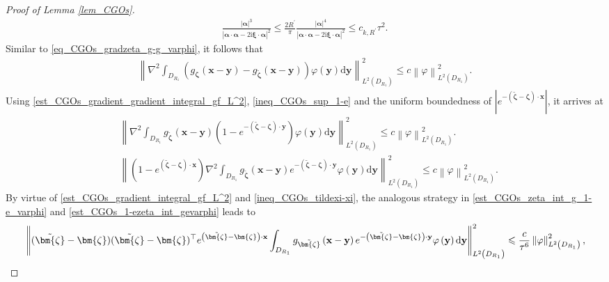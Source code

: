 \documentclass[11pt,reqno,oneside]{amsart}
\theoremstyle{definition}
\theoremstyle{remark}
\numberwithin{equation}{section}
\numberwithin{equation}{section}
\theoremstyle{remark}
\begin{document}
\begin{proof}[Proof of Lemma \ref{lem_CGOs}]
	\begin{align*} 
		\frac{\left| \bm{\alpha} \right|^3}{\left|\bm{\alpha} \cdot \bm{\alpha} - 2\mathrm{i} \bm{\xi} \cdot \bm{\alpha}\right|^2} \leqslant \frac{2R^{\prime}}{\pi}\frac{\left| \bm{\alpha} \right|^4}{\left|\bm{\alpha} \cdot \bm{\alpha} - 2\mathrm{i} \bm{\xi} \cdot \bm{\alpha}\right|^2} \leqslant c_{k,R^{\prime}} \tau^2.
	\end{align*}
	Similar to \eqref{eq_CGOs_gradzeta_g-g_varphi}, it follows that
	\begin{align*}
		\left\| \nabla^2 \int_{D_{R_1}} \left(g_{\bm{\zeta}}\left(\mathbf{x} - \mathbf{y}\right) - g_{\tilde{\bm{\zeta}}}\left(\mathbf{x} - \mathbf{y}\right)\right) \varphi \left(\mathbf{y}\right) \mathrm{d} \mathbf{y} \right\|^2_{L^2\left(D_{R_1}\right)} \leqslant c \left\| \varphi \right\|^2_{L^2\left(D_{R_1}\right)} .
	\end{align*}
	Using \eqref{est_CGOs_gradient_gradient_integral_gf_L^2}, \eqref{ineq_CGOs_sup_1-e} and the uniform boundedness of $ \left| e^{-\left(\tilde{\bm{\zeta}}-\bm{\zeta}\right) \cdot \mathbf{x}} \right| $, it arrives at 
	\begin{align*} 
		& \left\| \nabla^2 \int_{D_{R_1}} g_{\tilde{\bm{\zeta}}}\left(\mathbf{x} - \mathbf{y}\right) \left(1 - e^{-\left(\tilde{\bm{\zeta}}-\bm{\zeta}\right) \cdot \mathbf{y}} \right) \varphi \left(\mathbf{y}\right) \mathrm{d} \mathbf{y} \right\|^2_{L^2\left(D_{R_1}\right)} \leqslant c \left\| \varphi \right\|^2_{L^2\left(D_{R_1}\right)} . \\
		& \left\| \left(1 - e^{\left(\tilde{\bm{\zeta}}-\bm{\zeta}\right) \cdot \mathbf{x}} \right) \nabla^2 \int_{D_{R_1}} g_{\tilde{\bm{\zeta}}}\left(\mathbf{x} - \mathbf{y}\right) e^{-\left(\tilde{\bm{\zeta}}-\bm{\zeta}\right) \cdot \mathbf{y}} \varphi \left(\mathbf{y}\right) \mathrm{d} \mathbf{y} \right\|^2_{L^2\left(D_{R_1}\right)} \leqslant c \left\| \varphi \right\|^2_{L^2\left(D_{R_1}\right)} .
	\end{align*}
	By virtue of \eqref{est_CGOs_gradient_integral_gf_L^2} and \eqref{ineq_CGOs_tildexi-xi}, the analogous strategy in \eqref{est_CGOs_zeta_int_g_1-e_varphi} and \eqref{est_CGOs_1-ezeta_int_gevarphi} leads to
	\begin{align*} 
		& \left\| (\tilde{\bm{\zeta}}-\bm{\zeta}) (\tilde{\bm{\zeta}}-\bm{\zeta})^{\top} e^{\left(\tilde{\bm{\zeta}}-\bm{\zeta}\right) \cdot \mathbf{x}} \int_{D_{R_1}} g_{\tilde{\bm{\zeta}}}\left(\mathbf{x} - \mathbf{y}\right) e^{-\left(\tilde{\bm{\zeta}}-\bm{\zeta}\right) \cdot \mathbf{y}} \varphi \left(\mathbf{y}\right) \mathrm{d} \mathbf{y} \right\|^2_{L^2\left(D_{R_1}\right)} \notag \leqslant \frac{c}{\tau^6} \left\| \varphi \right\|^2_{L^2\left(D_{R_1}\right)}, \\

\end{align*}
\end{proof}
\end{document}
